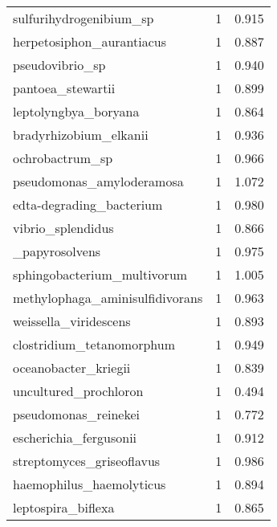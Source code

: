\begin{tabular}{lrr}
                     sulfurihydrogenibium\_sp &                   1 &     0.915 \\
                   herpetosiphon\_aurantiacus &                   1 &     0.887 \\
                             pseudovibrio\_sp &                   1 &     0.940 \\
                           pantoea\_stewartii &                   1 &     0.899 \\
                        leptolyngbya\_boryana &                   1 &     0.864 \\
                      bradyrhizobium\_elkanii &                   1 &     0.936 \\
                             ochrobactrum\_sp &                   1 &     0.966 \\
                   pseudomonas\_amyloderamosa &                   1 &     1.072 \\
                    edta-degrading\_bacterium &                   1 &     0.980 \\
                           vibrio\_splendidus &                   1 &     0.866 \\
                 [clostridium]\_papyrosolvens &                   1 &     0.975 \\
                 sphingobacterium\_multivorum &                   1 &     1.005 \\
             methylophaga\_aminisulfidivorans &                   1 &     0.963 \\
                       weissella\_viridescens &                   1 &     0.893 \\
                   clostridium\_tetanomorphum &                   1 &     0.949 \\
                        oceanobacter\_kriegii &                   1 &     0.839 \\
                       uncultured\_prochloron &                   1 &     0.494 \\
                        pseudomonas\_reinekei &                   1 &     0.772 \\
                      escherichia\_fergusonii &                   1 &     0.912 \\
                   streptomyces\_griseoflavus &                   1 &     0.986 \\
                    haemophilus\_haemolyticus &                   1 &     0.894 \\
                          leptospira\_biflexa &                   1 &     0.865 \\

\end{tabular}
